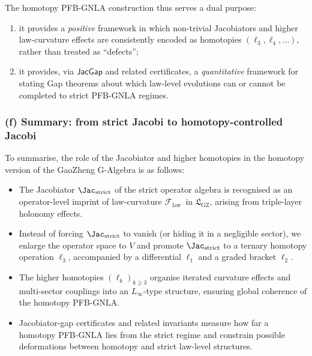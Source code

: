 \documentclass[11pt]{book}
\theoremstyle{plain}
\theoremstyle{definition}
\newcommand{\GZLS}{\ensuremath{\mathfrak{L}_{\mathrm{GZ}}}}       \newcommand{\GZLT}{\ensuremath{M_{!w}}}                           \newcommand{\GZLOC}{\ensuremath{A_M}}                             \newcommand{\GZLCurv}{\ensuremath{\mathcal{F}_{\mathrm{law}}}}
\begin{document}
The homotopy PFB-GNLA construction thus serves a dual purpose:

\begin{enumerate}[label=\alph*)]
  \item it provides a \emph{positive} framework in which non-trivial
        Jacobiators and higher law-curvature effects are consistently
        encoded as homotopies $(\ell_3,\ell_4,\dots)$, rather than
        treated as “defects”;
  \item it provides, via $\mathsf{JacGap}$ and related certificates,
        a \emph{quantitative} framework for stating Gap theorems about
        which law-level evolutions can or cannot be completed to strict
        PFB-GNLA regimes.
\end{enumerate}



\subsubsection*{(f) Summary: from strict Jacobi to homotopy-controlled Jacobi}

To summarise, the role of the Jacobiator and higher homotopies in the
homotopy version of the GaoZheng G-Algebra is as follows:

\begin{itemize}
  \item The Jacobiator $\Jac_{\mathrm{strict}}$ of the strict operator
        algebra is recognised as an operator-level imprint of
        law-curvature \GZLCurv\ in \GZLS, arising from triple-layer
        holonomy effects.
  \item Instead of forcing $\Jac_{\mathrm{strict}}$ to vanish (or
        hiding it in a negligible sector), we enlarge the operator
        space to $V$ and promote $\Jac_{\mathrm{strict}}$ to a ternary
        homotopy operation $\ell_3$, accompanied by a differential
        $\ell_1$ and a graded bracket $\ell_2$.
  \item The higher homotopies $(\ell_k)_{k\ge3}$ organise iterated
        curvature effects and multi-sector couplings into an
        $L_\infty$-type structure, ensuring global coherence of the
        homotopy PFB-GNLA.
  \item Jacobiator-gap certificates and related invariants measure
        how far a homotopy PFB-GNLA lies from the strict regime and
        constrain possible deformations between homotopy and strict
        law-level structures.
\end{itemize}
\end{document}
